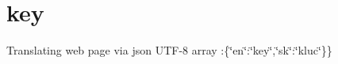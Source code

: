 \hypertarget{key-example}{\section{key}
}
Translating web page via json U\-T\-F-\/8 array \-:\{\char`\"{}en\char`\"{}\-:\char`\"{}key\char`\"{},\char`\"{}sk\char`\"{}\-:\char`\"{}kluc\char`\"{}\}\}


\begin{DoxyCodeInclude}
\end{DoxyCodeInclude}
 